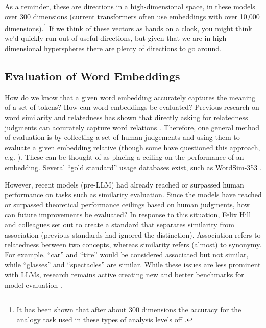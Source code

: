 As a reminder, these are directions in a high-dimensional space, in these models over 300 dimensions (current transformers often use embeddings with over 10,000 dimensions).\footnote{It has been shown that after about 300 dimensions the accuracy for the analogy task used in these types of analysis levels off \cite{pennington2014glove}.}  If we think of these vectors as hands on a clock, you might think we'd quickly run out of useful directions, but given that we are in high dimensional hyperspheres there are plenty of directions to go around.


\subsection{Evaluation of Word Embeddings}


How do we know that a given word embedding accurately captures the meaning of a set of tokens? How can word embeddings be evaluated? Previous research on word similarity and relatedness has shown that directly asking for relatedness judgments can accurately capture word relations \cite{finkelstein2001placing}. Therefore, one general method of evaluation is by collecting a set of human judgements and using them to evaluate a given embedding relative (though some have questioned this approach, e.g. \cite{richie2022inter}). These can be thought of as placing a ceiling on the performance of an embedding. Several ``gold standard'' usage databases exist, such as WordSim-353 \cite{finkelstein2001placing, agirre2009study}. 

However, recent models (pre-LLM) had already reached or surpassed human performance on tasks such as similarity evaluation. Since the models have reached or surpassed theoretical performance ceilings based on human judgments, how can future improvements be evaluated? In response to this situation, Felix Hill and colleagues \cite{hill2015simlex} set out to create a standard that separates similarity from association (previous standards had ignored the distinction). Association refers to relatedness between two concepts, whereas similarity refers (almost) to synonymy. For example, ``car'' and ``tire'' would be considered associated but not similar, while ``glasses'' and ``spectacles'' are similar. While these issues are less prominent with LLMs, research remains active creating new and better benchmarks for model evaluation \cite{bugliarello2023measuring}.

